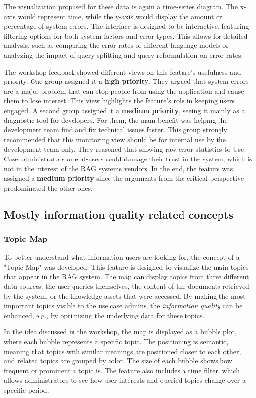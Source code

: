 \documentclass[
	english,
	ruledheaders=section,%
	class=report,%
	thesis={type=bachelor},%
	accentcolor=1b,%
	custommargins=true,%
	marginpar=false,%
	parskip=half-,%
	fontsize=11pt,%
	DIV=14,
]{tudapub}
\begin{document}
The visualization proposed for these data is again a time-series diagram. The x-axis would represent time, while the y-axis would display the amount or percentage of system errors. The interface is designed to be interactive, featuring filtering options for both system factors and error types. This allows for detailed analysis, such as comparing the error rates of different language models or analyzing the impact of query splitting and query reformulation on error rates.

The workshop feedback showed different views on this feature's usefulness and priority. One group assigned it a \textbf{high priority}. They argued that system errors are a major problem that can stop people from using the application and cause them to lose interest. This view highlights the feature's role in keeping users engaged. A second group assigned it a \textbf{medium priority}, seeing it mainly as a diagnostic tool for developers. For them, the main benefit was helping the development team find and fix technical issues faster. This group strongly recommended that this monitoring view should be for internal use by the development team only. They reasoned that showing raw error statistics to Use Case administrators or end-users could damage their trust in the system, which is not in the interest of the RAG systems vendors. In the end, the feature was assigned a \textbf{medium priority} since the arguments from the critical perspective predominated the other ones.
\subsection{Mostly information quality related concepts}
\subsubsection{Topic Map}
To better understand what information users are looking for, the concept of a "Topic Map" was developed. This feature is designed to visualize the main topics that appear in the RAG system. The map can display topics from three different data sources: the user queries themselves, the content of the documents retrieved by the system, or the knowledge assets that were accessed. By making the most important topics visible to the use case admins, the \textit{information quality} can be enhanced, e.g., by optimizing the underlying data  for these topics.

In the idea discussed in the workshop, the map is displayed as a bubble plot, where each bubble represents a specific topic. The positioning is semantic, meaning that topics with similar meanings are positioned closer to each other, and related topics are grouped by color. The size of each bubble shows how frequent or prominent a topic is. The feature also includes a time filter, which allows administrators to see how user interests and queried topics change over a specific period.
\end{document}
